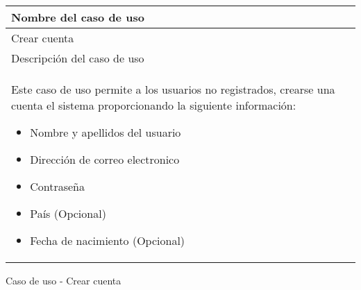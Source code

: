 \begin{identificacionCasoDeUso}
	\begin{tabular} { | p{17cm} |}

		\hline
		Nombre del caso de uso               \\ \hline
		Crear cuenta                         \\ \hline
		Descripción del caso de uso          \\ \hline
		Este caso de uso permite a los usuarios no registrados, crearse una cuenta el sistema proporcionando la siguiente información:
		\begin{itemize}
			\item Nombre y apellidos del usuario
			\item Dirección de correo electronico
			\item Contraseña
			\item País (Opcional)
			\item Fecha de nacimiento (Opcional)
		\end{itemize} \\ \hline
	\end{tabular}
	\caption{Caso de uso - Crear cuenta}
\end{identificacionCasoDeUso}